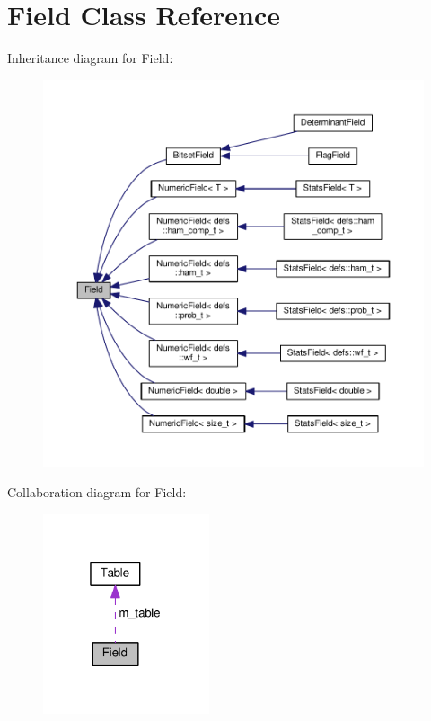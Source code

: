 \hypertarget{classField}{}\section{Field Class Reference}
\label{classField}


Inheritance diagram for Field\+:\nopagebreak
\begin{figure}[H]
\begin{center}
\leavevmode
\includegraphics[width=350pt]{classField__inherit__graph}
\end{center}
\end{figure}


Collaboration diagram for Field\+:\nopagebreak
\begin{figure}[H]
\begin{center}
\leavevmode
\includegraphics[width=139pt]{classField__coll__graph}
\end{center}
\end{figure}
